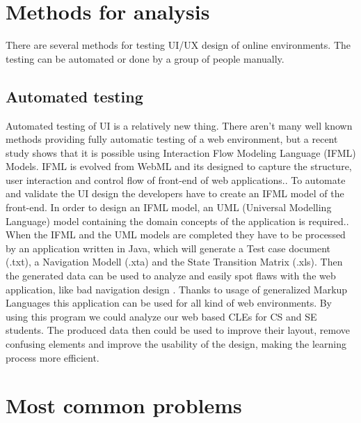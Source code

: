 \documentclass[10pt,english,a4paper]{article} %
\begin{document}


\section{Methods for analysis}\label{methods}
There are several methods for testing UI/UX design of online environments. The testing 
can be automated or done by a group of people manually.

\subsection{Automated testing}
Automated testing of UI is a relatively new thing.\cite{automated_testing_ifml} There aren't many well known methods
providing fully automatic testing of a web environment, but a recent study shows that
it is possible using Interaction Flow Modeling Language (IFML) Models.\cite{automated_testing_ifml}
IFML is evolved from WebML and its designed to capture the structure, user interaction and control
flow of front-end of web applications.\cite{automated_testing_ifml}.
To automate and validate the UI design the developers have to create an IFML model
of the front-end. In order to design an IFML model, an UML (Universal Modelling Language) model 
containing the domain concepts of the application is required.\cite{automated_testing_ifml}. 
When the IFML and the UML models are completed they have to be processed by an application written 
in Java, which will generate a Test case document (.txt), a Navigation Modell (.xta) and the State Transition 
Matrix (.xls). Then the generated data can be used to analyze and easily spot flaws with the web application, like bad navigation design
\cite{automated_testing_ifml}. 
Thanks to usage of generalized Markup Languages this application can be used for all kind of web environments. 
By using this program we could analyze our web based CLEs for CS and SE students. 
The produced data then could be used to improve their layout, remove confusing elements and improve the usability of the design,
making the learning process more efficient.


\section{Most common problems}\label{problems}
\end{document}
